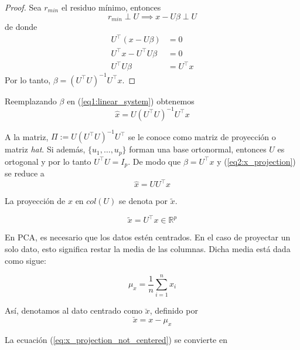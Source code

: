 \documentclass{article}
\numberwithin{equation}{section}
\theoremstyle{remark}
\theoremstyle{definition}
\theoremstyle{remark}
\theoremstyle{remark}
\begin{document}
\begin{proof}
Sea $r_{min}$ el residuo mínimo, entonces 
$$r_{min} \perp U \implies x - U \beta \perp U$$
de donde
\begin{align*}
    U^\intercal (x - U \beta) &= 0 \\
    U^\intercal x - U^\intercal U \beta &= 0 \\
    U^\intercal U \beta &= U^\intercal x 
\end{align*}
Por lo tanto, $\beta = (U^\intercal U)^{-1} U^\intercal x$.
\end{proof}

Reemplazando $\beta$ en (\ref{eq1:linear_system}) obtenemos
\begin{equation}
\label{eq2:x_projection}
\hat{x} = U (U^\intercal U)^{-1} U^\intercal x
\end{equation}

A la matriz, $\Pi := U (U^\intercal U)^{-1} U^\intercal$ se le conoce como matriz de proyección o matriz \textit{hat}.
Si además, $\{u_1, \ldots, u_p\}$ forman una base ortonormal, entonces $U$ es ortogonal y por lo tanto $U^\intercal U = I_p$. 
De modo que $\beta = U^\intercal x$ y (\ref{eq2:x_projection}) se reduce a
\begin{equation}
    \label{eq3:x_projection_orthogonal}
    \hat{x} = U U^\intercal x
\end{equation}

La proyección de $x$ en $col(U)$ se denota por $\tilde{x}$.

\begin{equation}
    \label{eq:x_projection_not_centered}
    \tilde{x} = U^\intercal x \in \mathbb{R}^p
\end{equation} 

En PCA, es necesario que los datos estén centrados. En el caso de proyectar un solo dato, esto significa
restar la media de las columnas. Dicha media está dada como sigue:

\begin{equation}
    \mu_x = \frac{1}{n} \sum_{i = 1}^n x_i
\end{equation}

Así, denotamos al dato centrado como $\breve{x}$, definido por
\begin{equation}
    \label{eq:x_breve}
    \breve{x} = x - \mu_x
\end{equation}

La ecuación (\ref{eq:x_projection_not_centered}) se convierte en
\end{document}
